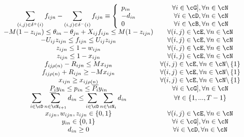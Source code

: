 $
\begin{array}{cc}

\displaystyle\sum_{(i,j) \in \delta^+(i)}f_{ijn} - \sum_{(i,j) \in \delta^-(i)}{f_{ijn}} \equiv  
	\left\{ 
	\begin{array}{l}
			p_{in} \\
			 -d_{in} \\
			 0
	\end{array}
	\right.  
		&
	\begin{array}{r}
			\forall i \in \cG], \forall n \in \cN \\
			 \forall i \in \cD, \forall n \in \cN \\
			\forall i \in \cB, \forall n \in \cN 
	\end{array}\\

 -M(1-z_{ijn}) \le \theta_{in} - \theta_{jn} + X_{ij} f_{ijn} \le M (1-z_{ijn}) 
	& \forall (i,j) \in \cE, \forall n \in \cN  \\

-U_{ij} z_{ijn} \le f_{ijn} \le U_{ij} z_{ijn} 
	&  \forall (i,j) \in \cE, \forall n \in \cN \\

z_{ijn} \le 1-w_{ijn}  
	&  \forall (i,j) \in \cE, \forall n \in \cN \\

z_{ijn} \le 1 - x_{ijn} 
	&  \forall (i,j) \in \cE, \forall n \in \cN \\

f_{ij\rho(n)} - R_{ijn} \le M x_{ijn} 
	&  \forall (i,j) \in \cE, \forall n \in \cN \backslash \left\{ 1 \right\} \\

f_{ij\rho(n)} + R_{ijn} \ge - M x_{ijn} 
	&  \forall (i,j) \in \cE, \forall n \in \cN \backslash \left\{ 1 \right\} \\

x_{ijn} \ge x_{ij\rho(n)}  
	&  \forall (i,j) \in \cE, \forall n \in \cN \backslash \left\{ 1 \right\} \\

\underline{P_i} y_{in} \le p_{in} \le \overline{P_i} y_{in} 
	&  \forall i \in \cG], \forall n \in \cN \\

\displaystyle \sum_{i \in \cD}{ \sum_{n \in \cN_{t+1} }{ d_{in} } }\le \sum_{i \in \cD}{ \sum_{n \in \cN_t }{ d_{in} } } 
	&  \forall t \in \left\{ 1, ..., T-1 \right\}  \\

x_{ijn}, w_{ijn}, z_{ijn} \in \left\{ 0,1 \right\} 	
	&  \forall  (i,j) \in \cE, \forall n \in \cN \\

y_{in} \in \left\{ 0,1 \right\}
	&  \forall  i \in \cG], \forall n \in \cN \\

d_{in} \ge 0 	
	&  \forall  i \in \cD, \forall n \in \cN 

\end{array}
$


